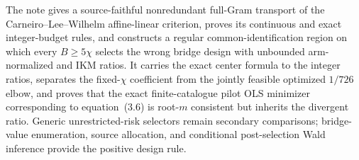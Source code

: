 The note gives a source-faithful nonredundant full-Gram transport of the Carneiro--Lee--Wilhelm affine-linear criterion, proves its continuous and exact integer-budget rules, and constructs a regular common-identification region on which every \(B\ge5\chi\) selects the wrong bridge design with unbounded arm-normalized and IKM ratios.  It carries the exact center formula to the integer ratios, separates the fixed-\(\chi\) coefficient from the jointly feasible optimized \(1/726\) elbow, and proves that the exact finite-catalogue pilot OLS minimizer corresponding to equation~(3.6) is root-\(m\) consistent but inherits the divergent ratio.  Generic unrestricted-risk selectors remain secondary comparisons; bridge-value enumeration, source allocation, and conditional post-selection Wald inference provide the positive design rule.